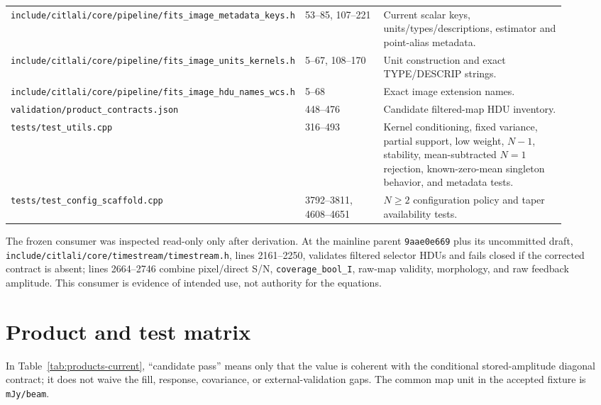 \documentclass[11pt]{article}
\newcommand{\code}[1]{\nolinkurl{#1}}
\begin{document}
\begin{longtable}{L{0.37\linewidth}L{0.17\linewidth}L{0.37\linewidth}}
\code{include/citlali/core/pipeline/fits_image_metadata_keys.h} & 53--85, 107--221 & Current scalar keys, units/types/descriptions, estimator and point-alias metadata.\\
\code{include/citlali/core/pipeline/fits_image_units_kernels.h} & 5--67, 108--170 & Unit construction and exact TYPE/DESCRIP strings.\\
\code{include/citlali/core/pipeline/fits_image_hdu_names_wcs.h} & 5--68 & Exact image extension names.\\
\code{validation/product_contracts.json} & 448--476 & Candidate filtered-map HDU inventory.\\
\code{tests/test_utils.cpp} & 316--493 & Kernel conditioning, fixed variance, partial support, low weight, $N-1$, stability, mean-subtracted $N=1$ rejection, known-zero-mean singleton behavior, and metadata tests.\\
\code{tests/test_config_scaffold.cpp} & 3792--3811, 4608--4651 & $N\ge2$ configuration policy and taper availability tests.\\
\bottomrule
\end{longtable}

The frozen consumer was inspected read-only only after derivation.  At the
mainline parent \code{9aae0e669} plus its uncommitted draft,
\code{include/citlali/core/timestream/timestream.h}, lines 2161--2250, validates
filtered selector HDUs and fails closed if the corrected contract is absent;
lines 2664--2746 combine pixel/direct S/N, \code{coverage_bool_I}, raw-map
validity, morphology, and raw feedback amplitude.  This consumer is evidence
of intended use, not authority for the equations.

\section{Product and test matrix}
\label{app:matrix}

In Table~\ref{tab:products-current}, ``candidate pass'' means only that the
value is coherent with the conditional stored-amplitude diagonal contract; it
does not waive the fill, response, covariance, or external-validation gaps.
The common map unit in the accepted fixture is \code{mJy/beam}.
\end{document}
